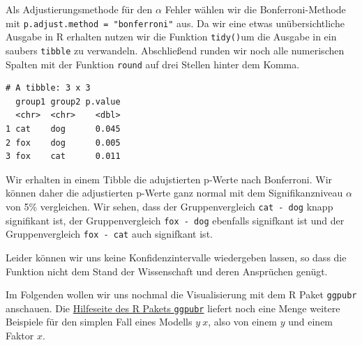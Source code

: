 \documentclass[
  letterpaper,
  DIV=11,
  oneside]{scrreport}
\newenvironment{Shaded}{\begin{snugshade}}{\end{snugshade}}
\newcommand{\AttributeTok}[1]{\textcolor[rgb]{0.40,0.45,0.13}{#1}}
\newcommand{\DecValTok}[1]{\textcolor[rgb]{0.68,0.00,0.00}{#1}}
\newcommand{\FunctionTok}[1]{\textcolor[rgb]{0.28,0.35,0.67}{#1}}
\newcommand{\NormalTok}[1]{\textcolor[rgb]{0.00,0.23,0.31}{#1}}
\newcommand{\SpecialCharTok}[1]{\textcolor[rgb]{0.37,0.37,0.37}{#1}}
\newcommand{\StringTok}[1]{\textcolor[rgb]{0.13,0.47,0.30}{#1}}
\begin{document}

Als Adjustierungsmethode für den \(\alpha\) Fehler wählen wir die
Bonferroni-Methode mit \texttt{p.adjust.method\ =\ "bonferroni"} aus. Da
wir eine etwas unübersichtliche Ausgabe in R erhalten nutzen wir die
Funktion \texttt{tidy()}um die Ausgabe in ein saubers \texttt{tibble} zu
verwandeln. Abschließend runden wir noch alle numerischen Spalten mit
der Funktion \texttt{round} auf drei Stellen hinter dem Komma.

\begin{Shaded}
\end{Shaded}

\begin{verbatim}
# A tibble: 3 x 3
  group1 group2 p.value
  <chr>  <chr>    <dbl>
1 cat    dog      0.045
2 fox    dog      0.005
3 fox    cat      0.011
\end{verbatim}

Wir erhalten in einem Tibble die adujstierten p-Werte nach Bonferroni.
Wir können daher die adjustierten p-Werte ganz normal mit dem
Signifikanzniveau \(\alpha\) von 5\% vergleichen. Wir sehen, dass der
Gruppenvergleich \texttt{cat\ -\ dog} knapp signifikant ist, der
Gruppenvergleich \texttt{fox\ -\ dog} ebenfalls signifkant ist und der
Gruppenvergleich \texttt{fox\ -\ cat} auch signifkant ist.

Leider können wir uns keine Konfidenzintervalle wiedergeben lassen, so
dass die Funktion nicht dem Stand der Wissenschaft und deren Ansprüchen
genügt.

Im Folgenden wollen wir uns nochmal die Visualisierung mit dem R Paket
\texttt{ggpubr} anschauen. Die
\href{https://rpkgs.datanovia.com/ggpubr/index.html}{Hilfeseite des R
Pakets \texttt{ggpubr}} liefert noch eine Menge weitere Beispiele für
den simplen Fall eines Modells \(y ~ x\), also von einem \(y\) und einem
Faktor \(x\).
\end{document}
